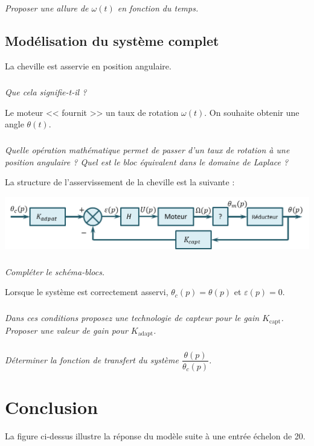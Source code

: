 \documentclass[10pt,fleqn]{article} %
\begin{document}
\begin{multicols}{2}
\subparagraph{}\textit{Proposer une allure de $\omega(t)$ en fonction du temps.}


\subsection*{Modélisation du système complet}
La cheville est asservie en position angulaire.
\subparagraph{}\textit{Que cela signifie-t-il ?}

\vspace{.25cm}

Le moteur << fournit >> un taux de rotation $\omega(t)$. On souhaite obtenir une angle $\theta(t)$.
\subparagraph{}\textit{Quelle opération mathématique permet de passer d'un taux de rotation à une position angulaire ? Quel est le bloc équivalent  dans le domaine de Laplace ?}

La structure de l'asservissement de la cheville est la suivante :

\begin{center}
\includegraphics[width=\linewidth]{images/fig_04}
\end{center}


\subparagraph{}\textit{Compléter le schéma-blocs.}

\vspace{.25cm}
Lorsque le système est correctement asservi, $\theta_c(p)=\theta(p)$ et $\varepsilon(p)=0$.

\subparagraph{}\textit{Dans ces conditions proposez une technologie de capteur pour le gain $K_{\text{capt}}$. Proposer une valeur de gain pour $K_{\text{adapt}}$.}

\subparagraph{}\textit{Déterminer la fonction de transfert du système $\dfrac{\theta(p)}{\theta_c(p)}$.}
\section*{Conclusion}

La figure ci-dessus illustre la réponse du modèle suite à une entrée échelon de 20\degres.


\end{multicols}
\end{document}
